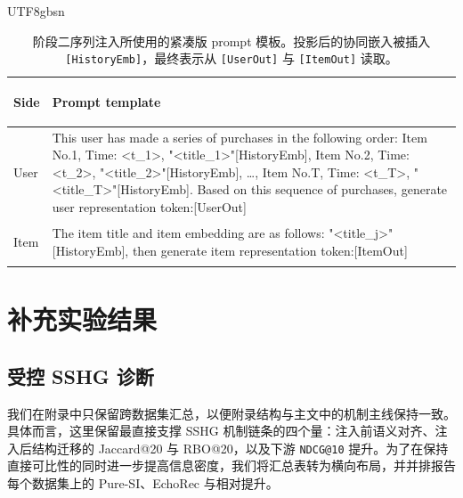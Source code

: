 \documentclass{article}
\begin{document}
\begin{CJK*}{UTF8}{gbsn}
\begin{table}[t]
\centering
\caption{阶段二序列注入所使用的紧凑版 prompt 模板。投影后的协同嵌入被插入 \texttt{[HistoryEmb]}，最终表示从 \texttt{[UserOut]} 与 \texttt{[ItemOut]} 读取。}
\label{tab:si_prompt_template}
\small
\setlength{\tabcolsep}{6pt}
\renewcommand{\arraystretch}{1.16}
\begin{tabularx}{\textwidth}{>{\bfseries\raggedright\arraybackslash}p{1.15cm} >{\ttfamily\footnotesize\raggedright\arraybackslash}X}
\toprule
Side & Prompt template \\
\midrule
User &
This user has made a series of purchases in the following order: Item No.1, Time: <t\_1>, "<title\_1>"[HistoryEmb], Item No.2, Time: <t\_2>, "<title\_2>"[HistoryEmb], \ldots, Item No.T, Time: <t\_T>, "<title\_T>"[HistoryEmb]. Based on this sequence of purchases, generate user representation token:[UserOut] \\
Item &
The item title and item embedding are as follows: "<title\_j>"[HistoryEmb], then generate item representation token:[ItemOut] \\
\bottomrule
\end{tabularx}
\end{table}

\section{补充实验结果}
\label{app:extra_results}

\subsection{受控 SSHG 诊断}
\label{app:prelim_extra}

我们在附录中只保留跨数据集汇总，以便附录结构与主文中的机制主线保持一致。具体而言，这里保留最直接支撑 SSHG 机制链条的四个量：注入前语义对齐、注入后结构迁移的 Jaccard@20 与 RBO@20，以及下游 \texttt{NDCG@10} 提升。为了在保持直接可比性的同时进一步提高信息密度，我们将汇总表转为横向布局，并并排报告每个数据集上的 Pure-SI、EchoRec 与相对提升。


\end{CJK*}
\end{document}
